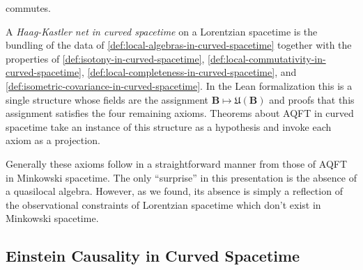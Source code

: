 \begin{definition}
    \begin{center}
    \end{center}

    commutes.
\end{definition}

\begin{definition}
    \label{def:haag-kastler-net-in-curved-spacetime}
    \leanok
    A \emph{Haag-Kastler net in curved spacetime} on a Lorentzian spacetime is the bundling of the data of \ref{def:local-algebras-in-curved-spacetime} together with the properties of \ref{def:isotony-in-curved-spacetime}, \ref{def:local-commutativity-in-curved-spacetime}, \ref{def:local-completeness-in-curved-spacetime}, and \ref{def:isometric-covariance-in-curved-spacetime}. In the Lean formalization this is a single structure whose fields are the assignment $\mathbf{B} \mapsto \mathfrak{U}(\mathbf{B})$ and proofs that this assignment satisfies the four remaining axioms. Theorems about AQFT in curved spacetime take an instance of this structure as a hypothesis and invoke each axiom as a projection.
\end{definition}

Generally these axioms follow in a straightforward manner from those of AQFT in Minkowski spacetime. The only ``surprise'' in this presentation is the absence of a quasilocal algebra. However, as we found, its absence is simply a reflection of the observational constraints of Lorentzian spacetime which don't exist in Minkowski spacetime.

\subsection{Einstein Causality in Curved Spacetime}

